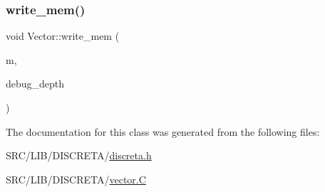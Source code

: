 \mbox{\label{class_vector_a080f85e2cdd81619713fbc486d6a6fb0}} 
\subsubsection{\texorpdfstring{write\+\_\+mem()}{write\_mem()}}
{\footnotesize\ttfamily void Vector\+::write\+\_\+mem (\begin{DoxyParamCaption}\item[{\mbox{\hyperlink{classmemory}{memory}} \&}]{m,  }\item[{\mbox{\hyperlink{galois_8h_a09fddde158a3a20bd2dcadb609de11dc}{I\+NT}}}]{debug\+\_\+depth }\end{DoxyParamCaption})}



The documentation for this class was generated from the following files\+:\begin{DoxyCompactItemize}
\item 
S\+R\+C/\+L\+I\+B/\+D\+I\+S\+C\+R\+E\+T\+A/\mbox{\hyperlink{discreta_8h}{discreta.\+h}}\item 
S\+R\+C/\+L\+I\+B/\+D\+I\+S\+C\+R\+E\+T\+A/\mbox{\hyperlink{vector_8_c}{vector.\+C}}\end{DoxyCompactItemize}
